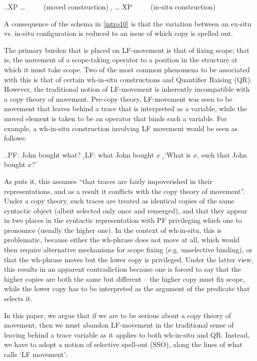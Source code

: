\documentclass[charis]{glossa}
\begin{document}
\ex.\label{intro10}\a.XP {\dots}  $\qquad$ (moved construction)
    \b. {\dots} XP $\qquad$ (in-situ construction)

A consequence of the schema in \ref{intro10} is that the variation between an ex-situ vs. in-situ configuration is reduced to an issue of which copy is spelled out.

The primary burden that is placed on LF-movement is that of fixing scope; that is, the movement of a scope-taking operator to a position in the structure at which it must take scope. Two of the most common phenomena to be associated with this is that of certain wh-in-situ constructions and Quantifier Raising (QR). However, the traditional notion of LF-movement is inherently incompatible with a copy theory of movement. Pre-copy theory, LF-movement was seen to be movement that leaves behind a trace that is interpreted as a variable, while the moved element is taken to be an operator that binds such a variable. For example, a wh-in-situ construction involving LF movement would be seen as follows:

\ex.\label{intro20}\a.PF: John bought what?
   \b.LF: what John bought $x$
   \b.`What is $x$, such that John bought $x$?'

As \cite{fox:2002} puts it, this assumes ``that traces are fairly impoverished in their representations, and as a result it conflicts with the copy theory of movement''. Under a copy theory, such traces are treated as identical copies of the same syntactic object (albeit selected only once and remerged), and that they appear in two places in the syntactic representation with PF privileging which one to pronounce (usually the higher one). In the context of wh-in-situ, this is problematic, because either the wh-phrase does not move at all, which would then require alternative mechanisms for scope fixing (e.g. unselective binding), or that the wh-phrase moves but the lower copy is privileged. Under the latter view, this results in an apparent contradiction because one is forced to say that the higher copies are both the same but different -- the higher copy must fix scope, while the lower copy has to be interpreted as the argument of the predicate that selects it.

In this paper, we argue that if we are to be serious about a copy theory of movement, then we must abandon LF-movement in the traditional sense of leaving behind a trace variable as it applies to both wh-in-situ and QR. Instead, we have to adopt a notion of selective spell-out (SSO), along the lines of what \cite{bobaljik:2002} calls `LF movement':
\end{document}

